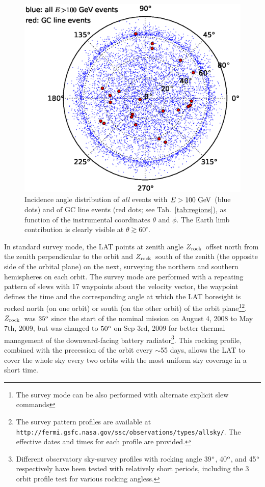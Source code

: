 \documentclass[aps,twocolumn,prd,superscriptaddress,showpacs,nofootinbib,fixfloat]{revtex4}
\newcommand{\GeV}{{\rm ~GeV}}
\newcommand{\degree}{^{\rm o}}
\newcommand{\zrock}{$Z_{\rm rock}$}
\begin{document}
\begin{figure}[h]
  \begin{center}
    \includegraphics[width=0.9\linewidth]{plots/polarCounts.eps}
    \vspace{-0.5cm}
  \end{center}
  \caption{Incidence angle distribution of \emph{all} events with $E>100\GeV$
  (blue dots) and of GC line events (red dots; see
  Tab.~\ref{tab:regions}), as function of the instrumental coordinates
  $\theta$ and $\phi$. The Earth limb contribution is clearly visible
  at $\theta\gtrsim 60^\circ$.}
  \label{fig:phiThetaDist}
\end{figure}

In standard survey mode, the LAT points at zenith angle
\zrock\ offset north from the zenith perpendicular to the
orbit and \zrock\ south of the zenith (the opposite side of
the orbital plane) on the next, surveying the northern and
southern hemispheres on each orbit. The survey mode are
performed with a repeating pattern of slews with 17
waypoints about the velocity vector, the waypoint defines
the time and the corresponding angle at which the LAT
boresight is rocked north (on one orbit) or south (on the
other orbit) of the orbit plane\footnote{The survey mode can
be also performed with alternate explicit slew
commands}\footnote{The survey pattern profiles are available
at
\texttt{http://fermi.gsfc.nasa.gov/ssc/observations/types/allsky/}.
The effective dates and times for each profile are
provided. }. \zrock\ was $35\degree$ since the start of the
nominal mission on August 4, 2008 to May 7th, 2009, but was
changed to $50\degree$ on Sep 3rd, 2009 for better thermal
management of the downward-facing battery
radiator\footnote{Different observatory sky-survey profiles
with rocking angle 39$\degree$, 40$\degree$, and 45$\degree$
respectively have been tested with relatively short periods,
including the 3 orbit profile test for various rocking
angless.}. This rocking profile, combined with the
precession of the orbit every $\sim$55 days, allows the LAT
to cover the whole sky every two orbits with the most
uniform sky coverage in a short time.
\end{document}
